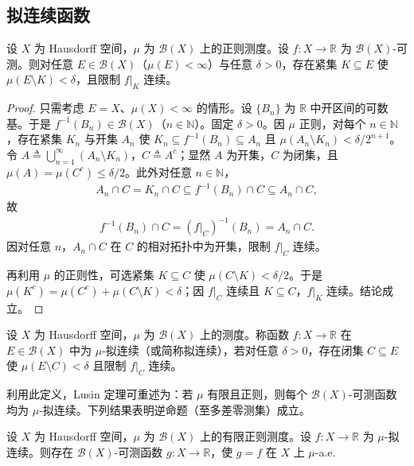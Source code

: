 \documentclass[../../main.tex]{subfiles}%
\begin{document}
\subsection{拟连续函数}\label{subsection:ch02-拟连续}

\begin{theorem}[Lusin]\label{theorem:ch02-Lusin}
设 $X$ 为 Hausdorff 空间，$\mu$ 为 $\mathscr B(X)$ 上的正则测度。设 $f:X\to\mathbb R$ 为 $\mathscr B(X)$-可测。则对任意 $E\in\mathscr B(X)$（$\mu(E)<\infty$）与任意 $\delta>0$，存在紧集 $K\subseteq E$ 使 $\mu(E\setminus K)<\delta$，且限制 $f|_K$ 连续。
\end{theorem}

\begin{proof}
只需考虑 $E=X$、$\mu(X)<\infty$ 的情形。设 $\{B_n\}$ 为 $\mathbb R$ 中开区间的可数基。于是 $f^{-1}(B_n)\in\mathscr B(X)$（$n\in\mathbb N$）。固定 $\delta>0$。因 $\mu$ 正则，对每个 $n\in\mathbb N$，存在紧集 $K_n$ 与开集 $A_n$ 使 $K_n\subseteq f^{-1}(B_n)\subseteq A_n$ 且 $\mu(A_n\setminus K_n)<\delta/2^{n+1}$。令 $A\triangleq \bigcup_{n=1}^\infty(A_n\setminus K_n)$，$C\triangleq A^c$；显然 $A$ 为开集，$C$ 为闭集，且 $\mu(A)=\mu(C^c)\leqslant\delta/2$。此外对任意 $n\in\mathbb N$，
\begin{align*}
A_n\cap C=K_n\cap C\subseteq f^{-1}(B_n)\cap C\subseteq A_n\cap C,
\end{align*}
故
\begin{align*}
f^{-1}(B_n)\cap C=(f|_C)^{-1}(B_n)=A_n\cap C.
\end{align*}
因对任意 $n$，$A_n\cap C$ 在 $C$ 的相对拓扑中为开集，限制 $f|_C$ 连续。

再利用 $\mu$ 的正则性，可选紧集 $K\subseteq C$ 使 $\mu(C\setminus K)<\delta/2$。于是 $\mu(K^c)=\mu(C^c)+\mu(C\setminus K)<\delta$；因 $f|_C$ 连续且 $K\subseteq C$，$f|_K$ 连续。结论成立。
\end{proof}

\begin{definition}\label{definition:ch02-拟连续}
设 $X$ 为 Hausdorff 空间，$\mu$ 为 $\mathscr B(X)$ 上的测度。称函数 $f:X\to\mathbb R$ 在 $E\in\mathscr B(X)$ 中为 $\mu$-拟连续（或简称拟连续），若对任意 $\delta>0$，存在闭集 $C\subseteq E$ 使 $\mu(E\setminus C)<\delta$ 且限制 $f|_C$ 连续。
\end{definition}

利用此定义，Lusin 定理可重述为：若 $\mu$ 有限且正则，则每个 $\mathscr B(X)$-可测函数均为 $\mu$-拟连续。下列结果表明逆命题（至多差零测集）成立。

\begin{proposition}\label{proposition:ch02-拟连续a.e.可测}
设 $X$ 为 Hausdorff 空间，$\mu$ 为 $\mathscr B(X)$ 上的有限正则测度。设 $f:X\to\mathbb R$ 为 $\mu$-拟连续。则存在 $\mathscr B(X)$-可测函数 $g:X\to\mathbb R$，使 $g=f$ 在 $X$ 上 $\mu$-a.e.
\end{proposition}
\end{document}
